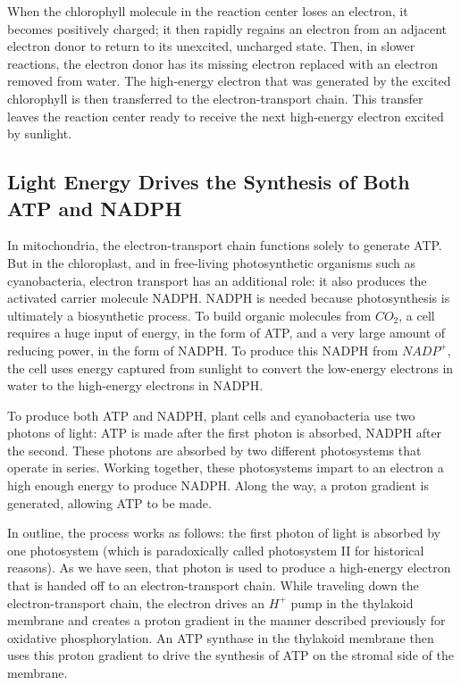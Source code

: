 When the chlorophyll molecule in the reaction center loses an electron,
it becomes positively charged; it then rapidly regains an electron from an
adjacent electron donor to return to its unexcited, uncharged state.
Then, in slower reactions, the electron donor has its missing
electron replaced with an electron removed from water. The high-energy
electron that was generated by the excited chlorophyll is then transferred
to the electron-transport chain. This transfer leaves the reaction center
ready to receive the next high-energy electron excited by sunlight.

\subsection{Light Energy Drives the Synthesis of Both ATP and NADPH}

In mitochondria, the electron-transport chain functions solely to generate
ATP. But in the chloroplast, and in free-living photosynthetic organisms
such as cyanobacteria, electron transport has an additional role: it also
produces the activated carrier molecule NADPH. NADPH
is needed because photosynthesis is ultimately a biosynthetic process. To
build organic molecules from $CO_2$, a cell requires a huge input of energy,
in the form of ATP, and a very large amount of reducing power, in the
form of NADPH. To produce this NADPH from $NADP^+$, the cell uses energy
captured from sunlight to convert the low-energy electrons in water to
the high-energy electrons in NADPH.

To produce both ATP and NADPH, plant cells and cyanobacteria use two
photons of light: ATP is made after the first photon is absorbed, NADPH
after the second. These photons are absorbed by two different photosystems
that operate in series. Working together, these photosystems impart
to an electron a high enough energy to produce NADPH. Along the way,
a proton gradient is generated, allowing ATP to be made.

In outline, the process works as follows: the first photon of light is
absorbed by one photosystem (which is paradoxically called photosystem
II for historical reasons). As we have seen, that photon is used to produce
a high-energy electron that is handed off to an electron-transport chain.
While traveling down the electron-transport chain,
the electron drives an $H^+$ pump in the thylakoid membrane and creates
a proton gradient in the manner described previously for oxidative phosphorylation.
An ATP synthase in the thylakoid membrane then uses this
proton gradient to drive the synthesis of ATP on the stromal side of the
membrane.

